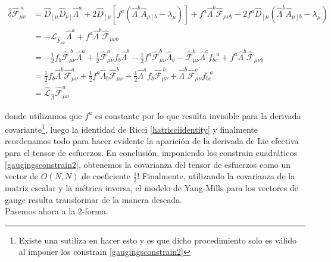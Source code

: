 \documentclass{article}
\numberwithin{equation}{section}
\newcommand\Fef{\hat{\mathcal{F}}_{\mu \nu}}
\newcommand\liegen[1]{\hat{\mathcal{L}}_{#1}}
\begin{document}
\begin{equation}
\begin{aligned}
\hat{\delta}\hat{\mathcal{F}}_{\mu\nu}^{\ a} &= \hat{D}_{\left[\mu\right.} \hat{D}_{\left.\nu\right]} \hat{\Lambda}^a + 2\hat{D}_{\left[\mu\right.}\left[f^a\left(\hat{\Lambda}^b\hat{A}_{\left.\mu \right]b} - \lambda_{\mu}\right)\right] +f^a \hat{\Lambda}^b \hat{\mathcal{F}}_{\mu \nu b} -  2f^a\hat{D}_{\left[\mu\right.}\left(\hat{\Lambda}^b\hat{A}_{\left.\mu \right]b} - \lambda_{\mu}\right)\\
&= -\mathcal{L}_{\hat{F}_{\mu\nu}} \hat{\Lambda}^a + f^a \hat{\Lambda}^b \hat{\mathcal{F}}_{\mu \nu b}\\
&=-\frac{1}{2} f_b \Fef^{\ b} \hat{\Lambda}^a + \frac{1}{2}\Fef^a f_b \hat{\Lambda}^b - \frac{1}{2} f^a\Fef^b \hat{\Lambda}_b - \Fef^b \hat{\Lambda}^c f_{b c}^{\ \ \ a} + f^a \hat{\Lambda}^b \hat{\mathcal{F}}_{\mu \nu b}\\
&= \frac{1}{2} f_b \hat{\Lambda}^b \Fef^a + \frac{1}{2} f^a \hat{\Lambda}_b \Fef^b - \frac{1}{2} \hat{\Lambda}^a f_b \Fef^{\ b} +  \hat{\Lambda}^b \Fef^c f_{b c}^{\ \ \ a}\\
&= \liegen{\hat{\Lambda}} \Fef^a
\end{aligned}
\end{equation}

donde utilizamos que $ f^a $ es constante por lo que resulta invisible para la derivada covariante\footnote{Existe una sutiliza en hacer esto y es que dicho procedimiento solo es válido al imponer los constrain \ref{gaugingsconstrain2}}, luego la identidad de Ricci \ref{hatricciidentity} y finalmente reordenamos todo para hacer evidente la aparición de la derivada de Lie efectiva para el tensor de esfuerzos. En conclusión, imponiendo los constrain cuadráticos \ref{gaugingsconstrain2}, obtenemos la covarianza del tensor de esfuerzos como un vector de $ O(N,N) $ de coeficiente $ \frac{1}{2} $! Finalmente, utilizando la covarianza de la matriz escalar y la métrica inversa, el modelo de Yang-Mills para los vectores de gauge resulta transformar de la manera deseada.\\

Pasemos ahora a la 2-forma.
\end{document}
